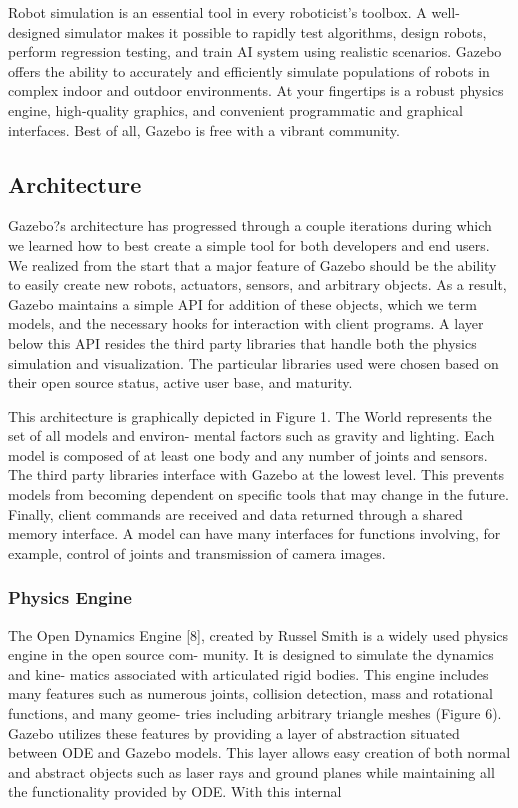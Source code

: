 Robot simulation is an essential tool in every roboticist's toolbox. A well-designed simulator makes it possible to rapidly test algorithms, design robots, perform regression testing, and train AI system using realistic scenarios. Gazebo offers the ability to accurately and efficiently simulate populations of robots in complex indoor and outdoor environments. At your fingertips is a robust physics engine, high-quality graphics, and convenient programmatic and graphical interfaces. Best of all, Gazebo is free with a vibrant community.

\subsection{Architecture}

Gazebo?s architecture has progressed through a couple iterations during which we learned how to best create a simple tool for both developers and end users. We realized from the start that a major feature of Gazebo should be the ability to easily create new robots, actuators, sensors, and arbitrary objects. As a result, Gazebo maintains a simple API for addition of these objects, which we term models, and the necessary hooks for interaction with client programs. A layer below this API resides the third party libraries that handle both the physics simulation and visualization. The particular libraries used were chosen based on their open source status, active user base, and maturity.

This architecture is graphically depicted in Figure 1. The World represents the set of all models and environ- mental factors such as gravity and lighting. Each model is composed of at least one body and any number of joints and sensors. The third party libraries interface with Gazebo at the lowest level. This prevents models from becoming dependent on specific tools that may change in the future. Finally, client commands are received and data returned through a shared memory interface. A model can have many interfaces for functions involving, for example, control of joints and transmission of camera images.

\subsubsection{Physics Engine}

The Open Dynamics Engine [8], created by Russel Smith is a widely used physics engine in the open source com- munity. It is designed to simulate the dynamics and kine- matics associated with articulated rigid bodies. This engine includes many features such as numerous joints, collision detection, mass and rotational functions, and many geome- tries including arbitrary triangle meshes (Figure 6). Gazebo utilizes these features by providing a layer of abstraction situated between ODE and Gazebo models. This layer allows easy creation of both normal and abstract objects such as laser rays and ground planes while maintaining all the functionality provided by ODE. With this internal

